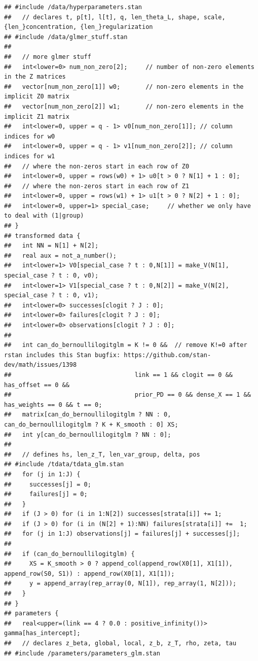 \documentclass[
]{article}
\begin{document}
\begin{verbatim}
## #include /data/hyperparameters.stan
##   // declares t, p[t], l[t], q, len_theta_L, shape, scale, {len_}concentration, {len_}regularization
## #include /data/glmer_stuff.stan
## 
##   // more glmer stuff
##   int<lower=0> num_non_zero[2];     // number of non-zero elements in the Z matrices
##   vector[num_non_zero[1]] w0;       // non-zero elements in the implicit Z0 matrix
##   vector[num_non_zero[2]] w1;       // non-zero elements in the implicit Z1 matrix
##   int<lower=0, upper = q - 1> v0[num_non_zero[1]]; // column indices for w0
##   int<lower=0, upper = q - 1> v1[num_non_zero[2]]; // column indices for w1
##   // where the non-zeros start in each row of Z0
##   int<lower=0, upper = rows(w0) + 1> u0[t > 0 ? N[1] + 1 : 0];  
##   // where the non-zeros start in each row of Z1
##   int<lower=0, upper = rows(w1) + 1> u1[t > 0 ? N[2] + 1 : 0];  
##   int<lower=0, upper=1> special_case;     // whether we only have to deal with (1|group)
## }
## transformed data {
##   int NN = N[1] + N[2];
##   real aux = not_a_number();
##   int<lower=1> V0[special_case ? t : 0,N[1]] = make_V(N[1], special_case ? t : 0, v0);
##   int<lower=1> V1[special_case ? t : 0,N[2]] = make_V(N[2], special_case ? t : 0, v1);
##   int<lower=0> successes[clogit ? J : 0];
##   int<lower=0> failures[clogit ? J : 0];
##   int<lower=0> observations[clogit ? J : 0];
## 
##   int can_do_bernoullilogitglm = K != 0 &&  // remove K!=0 after rstan includes this Stan bugfix: https://github.com/stan-dev/math/issues/1398
##                                  link == 1 && clogit == 0 && has_offset == 0 && 
##                                  prior_PD == 0 && dense_X == 1 && has_weights == 0 && t == 0;
##   matrix[can_do_bernoullilogitglm ? NN : 0, can_do_bernoullilogitglm ? K + K_smooth : 0] XS;
##   int y[can_do_bernoullilogitglm ? NN : 0];
## 
##   // defines hs, len_z_T, len_var_group, delta, pos
## #include /tdata/tdata_glm.stan
##   for (j in 1:J) {
##     successes[j] = 0;
##     failures[j] = 0;
##   }
##   if (J > 0) for (i in 1:N[2]) successes[strata[i]] += 1;
##   if (J > 0) for (i in (N[2] + 1):NN) failures[strata[i]] +=  1;
##   for (j in 1:J) observations[j] = failures[j] + successes[j];
## 
##   if (can_do_bernoullilogitglm) {
##     XS = K_smooth > 0 ? append_col(append_row(X0[1], X1[1]), append_row(S0, S1)) : append_row(X0[1], X1[1]);
##     y = append_array(rep_array(0, N[1]), rep_array(1, N[2]));
##   }
## }
## parameters {
##   real<upper=(link == 4 ? 0.0 : positive_infinity())> gamma[has_intercept];
##   // declares z_beta, global, local, z_b, z_T, rho, zeta, tau
## #include /parameters/parameters_glm.stan

\end{verbatim}
\end{document}
